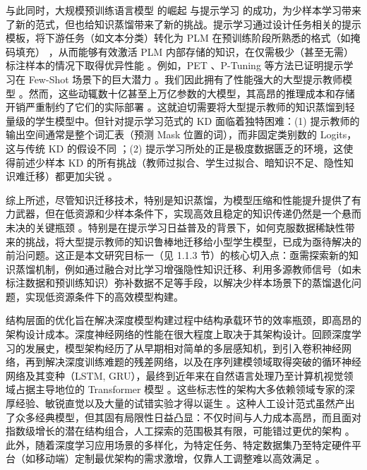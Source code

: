 \documentclass[../main.tex]{subfiles}
\begin{document}
与此同时，大规模预训练语言模型 的崛起 与提示学习 的成功，为少样本学习带来了新的范式，但也给知识蒸馏带来了新的挑战。提示学习通过设计任务相关的提示模板，将下游任务（如文本分类）转化为 PLM 在预训练阶段所熟悉的格式（如掩码填充） ，从而能够有效激活 PLM 内部存储的知识，在仅需极少（甚至无需）标注样本的情况下取得优异性能 。例如，PET 、P-Tuning 等方法已证明提示学习在 Few-Shot 场景下的巨大潜力 。我们因此拥有了性能强大的大型提示教师模型 。然而，这些动辄数十亿甚至上万亿参数的大模型，其高昂的推理成本和存储开销严重制约了它们的实际部署 。这就迫切需要将大型提示教师的知识蒸馏到轻量级的学生模型中。但针对提示学习范式的 KD 面临着独特困难：(1) 提示教师的输出空间通常是整个词汇表（预测 Mask 位置的词），而非固定类别数的 Logits，这与传统 KD 的假设不同 ；(2) 提示学习所处的正是极度数据匮乏的环境，这使得前述少样本 KD 的所有挑战（教师过拟合、学生过拟合、暗知识不足、隐性知识难迁移）都更加尖锐 。

综上所述，尽管知识迁移技术，特别是知识蒸馏，为模型压缩和性能提升提供了有力武器，但在低资源和少样本条件下，实现高效且稳定的知识传递仍然是一个悬而未决的关键瓶颈 。特别是在提示学习日益普及的背景下，如何克服数据稀缺性带来的挑战，将大型提示教师的知识鲁棒地迁移给小型学生模型，已成为亟待解决的前沿问题。这正是本文研究目标一（见 1.1.3 节）的核心切入点：亟需探索新的知识蒸馏机制，例如通过融合对比学习增强隐性知识迁移、利用多源教师信号（如未标注数据和预训练知识）弥补数据不足等手段，以解决少样本场景下的蒸馏退化问题，实现低资源条件下的高效模型构建。


结构层面的优化旨在解决深度模型构建过程中结构承载环节的效率瓶颈，即高昂的架构设计成本。深度神经网络的性能在很大程度上取决于其架构设计。回顾深度学习的发展史，模型架构经历了从早期相对简单的多层感知机，到引入卷积神经网络，再到解决深度训练难题的残差网络，以及在序列建模领域取得突破的循环神经网络及其变种（LSTM, GRU），最终到近年来在自然语言处理乃至计算机视觉领域占据主导地位的 Transformer 模型 。这些标志性的架构大多依赖领域专家的深厚经验、敏锐直觉以及大量的试错实验才得以诞生 。这种人工设计范式虽然产出了众多经典模型，但其固有局限性日益凸显：不仅时间与人力成本高昂，而且面对指数级增长的潜在结构组合，人工探索的范围极其有限，可能错过更优的架构 。此外，随着深度学习应用场景的多样化，为特定任务、特定数据集乃至特定硬件平台（如移动端）定制最优架构的需求激增，仅靠人工调整难以高效满足 。
\end{document}
